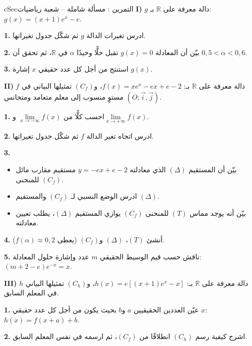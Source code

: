 \documentclass[12pt,a4paper]{article}
\newenvironment{BOX}[2]{\begin{otherlanguage}{english}\begin{arbox}{#1}{#2}}{\end{arbox}\end{otherlanguage}}
\newcounter{exo}
\newenvironment{tamrin}[1]{\stepcounter{exo}\begin{BOX}{cSec}{التمرين \theexo: #1}}{\end{BOX}}
\newcommand{\R}{\mathbb{R}}
\newenvironment{sq}{\begin{itemize}[leftmargin=2.4em,itemsep=3pt]}{\end{itemize}}
\newcommand{\qa}{\item[(أ)]}\newcommand{\qb}{\item[(ب)]}\newcommand{\qc}{\item[(جـ)]}\newcommand{\qd}{\item[(د)]}\newcommand{\qe}{\item[(هـ)]}
\newcommand{\QQ}[1]{\par\smallskip\textbf{#1.} }
\begin{document}
\begin{tamrin}{مسألة شاملة -- شعبة رياضيات}
\textbf{I)} $g$ دالة معرفة على $\R$ بـ: $g(x)=(x+1)e^{x}-e$.
\QQ{1} ادرس تغيرات الدالة $g$ ثم شكّل جدول تغيراتها.
\QQ{2} بيّن أن المعادلة $g(x)=0$ تقبل حلًّا وحيدًا $\alpha$ في $\R$، ثم تحقق أن $0{,}5<\alpha<0{,}6$.
\QQ{3} استنتج من أجل كل عدد حقيقي $x$ إشارة $g(x)$.

\textbf{II)} $f$ دالة معرفة على $\R$ بـ: $f(x)=xe^{x}-ex+e-2$، و$(C_f)$ تمثيلها البياني في مستوٍ منسوب إلى معلم متعامد ومتجانس $(O;\vec i,\vec j)$.
\QQ{1} احسب كلًّا من $\lim\limits_{x\to-\infty}f(x)$ و$\lim\limits_{x\to+\infty}f(x)$.
\QQ{2} ادرس اتجاه تغير الدالة $f$ ثم شكّل جدول تغيراتها.
\QQ{3}
\begin{sq}
\qa بيّن أن المستقيم $(\Delta)$ الذي معادلته $y=-ex+e-2$ مستقيم مقارب مائل للمنحنى $(C_f)$.
\qb ادرس الوضع النسبي لـ $(C_f)$ والمستقيم $(\Delta)$.
\qc بيّن أنه يوجد مماس $(T)$ للمنحنى $(C_f)$ يوازي المستقيم $(\Delta)$، يطلب تعيين معادلته.
\end{sq}
\QQ{4} أنشئ $(T)$، $(\Delta)$ و$(C_f)$ (يعطى $f(\alpha)\approx0{,}2$).
\QQ{5} ناقش حسب قيم الوسيط الحقيقي $m$ عدد وإشارة حلول المعادلة: $(m+2-e)e^{-x}=x$.

\textbf{III)} $h$ دالة معرفة على $\R$ بـ: $h(x)=e\left[(x+1)e^{x}-x\right]$، و$(C_h)$ تمثيلها البياني في المعلم السابق.
\QQ{1} عيّن العددين الحقيقيين $a$ و$b$ بحيث يكون من أجل كل عدد حقيقي $x$: $h(x)=f(x+a)+b$.
\QQ{2} اشرح كيفية رسم $(C_h)$ انطلاقًا من $(C_f)$، ثم ارسمه في نفس المعلم السابق.
\end{tamrin}
\end{document}
